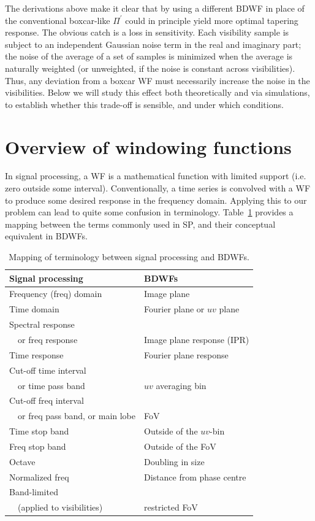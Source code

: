 \documentclass[useAMS,usenatbib]{mn2e}
\begin{document}
The derivations above make it clear that by using a different BDWF in place of the conventional boxcar-like $\Pi^\prime$ 
could in principle yield more optimal tapering response. The obvious catch is a loss in 
sensitivity. Each visibility sample is subject to an independent Gaussian noise term in the real and imaginary part; the noise of
the average of a set of samples is minimized when the average is naturally weighted (or unweighted, if the noise is 
constant across visibilities). Thus, any deviation from a boxcar WF must necessarily increase the noise in the 
visibilities. Below we will study this effect both theoretically and via simulations, to establish whether this 
trade-off is sensible, and under which conditions.

\section{Overview of windowing functions}
\label{subsec:Windowing functions}

In signal processing, a WF is a mathematical function with limited support (i.e. zero outside some interval). Conventionally,
a time series is convolved with a WF to produce some desired response in the frequency domain. Applying this to our problem
can lead to quite some confusion in terminology. Table~\ref{tab:terms} provides a mapping between the terms commonly used in SP, 
and their conceptual equivalent in BDWFs.

\begin{table}
\begin{tabular}{l|l}
\hline
 \bf Signal processing & \bf BDWFs\\
\hline\hline
Frequency (freq) domain & Image plane \\
Time domain & Fourier plane or $uv$ plane \\
Spectral response\\
~~or freq response & Image plane response (IPR)\\
Time response & Fourier plane response\\
Cut-off time interval  \\
~~or time pass band & $uv$ averaging bin\\
Cut-off freq interval \\
~~or freq pass band, or main lobe & FoV\\
Time stop band & Outside of the $uv$-bin\\
Freq stop band & Outside of the FoV\\
Octave & Doubling in size\\
Normalized freq & Distance from phase centre \\
Band-limited \\
~~(applied to visibilities) & restricted FoV \\
\end{tabular}
\caption{Mapping of terminology between signal processing and BDWFs.}
\label{tab:terms}
\end{table}
\end{document}
